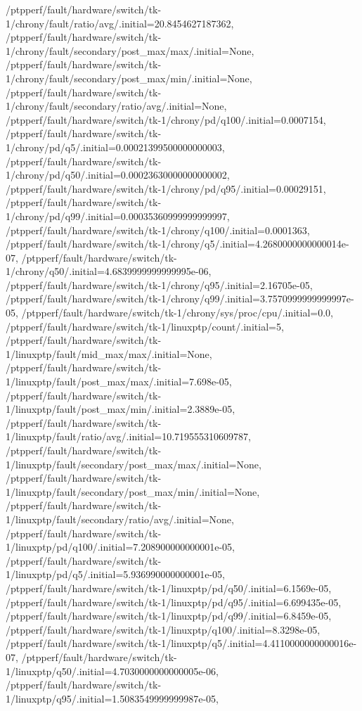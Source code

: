 {    /ptpperf/fault/hardware/switch/tk-1/chrony/fault/ratio/avg/.initial=20.8454627187362,
    /ptpperf/fault/hardware/switch/tk-1/chrony/fault/secondary/post_max/max/.initial=None,
    /ptpperf/fault/hardware/switch/tk-1/chrony/fault/secondary/post_max/min/.initial=None,
    /ptpperf/fault/hardware/switch/tk-1/chrony/fault/secondary/ratio/avg/.initial=None,
    /ptpperf/fault/hardware/switch/tk-1/chrony/pd/q100/.initial=0.0007154,
    /ptpperf/fault/hardware/switch/tk-1/chrony/pd/q5/.initial=0.00021399500000000003,
    /ptpperf/fault/hardware/switch/tk-1/chrony/pd/q50/.initial=0.00023630000000000002,
    /ptpperf/fault/hardware/switch/tk-1/chrony/pd/q95/.initial=0.00029151,
    /ptpperf/fault/hardware/switch/tk-1/chrony/pd/q99/.initial=0.00035360999999999997,
    /ptpperf/fault/hardware/switch/tk-1/chrony/q100/.initial=0.0001363,
    /ptpperf/fault/hardware/switch/tk-1/chrony/q5/.initial=4.2680000000000014e-07,
    /ptpperf/fault/hardware/switch/tk-1/chrony/q50/.initial=4.6839999999999995e-06,
    /ptpperf/fault/hardware/switch/tk-1/chrony/q95/.initial=2.16705e-05,
    /ptpperf/fault/hardware/switch/tk-1/chrony/q99/.initial=3.7570999999999997e-05,
    /ptpperf/fault/hardware/switch/tk-1/chrony/sys/proc/cpu/.initial=0.0,
    /ptpperf/fault/hardware/switch/tk-1/linuxptp/count/.initial=5,
    /ptpperf/fault/hardware/switch/tk-1/linuxptp/fault/mid_max/max/.initial=None,
    /ptpperf/fault/hardware/switch/tk-1/linuxptp/fault/post_max/max/.initial=7.698e-05,
    /ptpperf/fault/hardware/switch/tk-1/linuxptp/fault/post_max/min/.initial=2.3889e-05,
    /ptpperf/fault/hardware/switch/tk-1/linuxptp/fault/ratio/avg/.initial=10.719555310609787,
    /ptpperf/fault/hardware/switch/tk-1/linuxptp/fault/secondary/post_max/max/.initial=None,
    /ptpperf/fault/hardware/switch/tk-1/linuxptp/fault/secondary/post_max/min/.initial=None,
    /ptpperf/fault/hardware/switch/tk-1/linuxptp/fault/secondary/ratio/avg/.initial=None,
    /ptpperf/fault/hardware/switch/tk-1/linuxptp/pd/q100/.initial=7.208900000000001e-05,
    /ptpperf/fault/hardware/switch/tk-1/linuxptp/pd/q5/.initial=5.936990000000001e-05,
    /ptpperf/fault/hardware/switch/tk-1/linuxptp/pd/q50/.initial=6.1569e-05,
    /ptpperf/fault/hardware/switch/tk-1/linuxptp/pd/q95/.initial=6.699435e-05,
    /ptpperf/fault/hardware/switch/tk-1/linuxptp/pd/q99/.initial=6.8459e-05,
    /ptpperf/fault/hardware/switch/tk-1/linuxptp/q100/.initial=8.3298e-05,
    /ptpperf/fault/hardware/switch/tk-1/linuxptp/q5/.initial=4.4110000000000016e-07,
    /ptpperf/fault/hardware/switch/tk-1/linuxptp/q50/.initial=4.7030000000000005e-06,
    /ptpperf/fault/hardware/switch/tk-1/linuxptp/q95/.initial=1.5083549999999987e-05,
}
